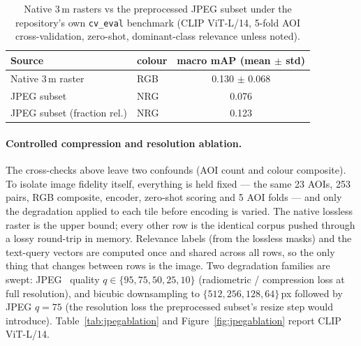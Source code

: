 \documentclass{article}
\begin{document}
\begin{appendices}
\begin{table}[H]
    \centering
    \caption{Native 3\,m rasters vs the preprocessed JPEG subset under the
    repository's own \texttt{cv\_eval} benchmark (CLIP ViT-L/14, 5-fold AOI
    cross-validation, zero-shot, dominant-class relevance unless noted).}
    \label{tab:native3mcv}
    \begin{tabular}{llc}
        \toprule
        \textbf{Source} & \textbf{colour} & \textbf{macro mAP (mean $\pm$ std)} \\
        \midrule
        Native 3\,m raster & RGB & 0.130 $\pm$ 0.068 \\
        JPEG subset                    & NRG & 0.076 \\
        JPEG subset (fraction rel.)    & NRG & 0.123 \\
        \bottomrule
    \end{tabular}
\end{table}

\paragraph{Controlled compression and resolution ablation.}
The cross-checks above leave two confounds (AOI count and colour composite). To
isolate image fidelity itself, everything is held fixed --- the same 23 AOIs, 253
pairs, RGB composite, encoder, zero-shot scoring and 5 AOI folds --- and only the
degradation applied to each tile before encoding is varied. The native lossless
raster is the upper bound; every other row is the identical corpus pushed through a
lossy round-trip in memory. Relevance labels (from the lossless masks) and the
text-query vectors are computed once and shared across all rows, so the only thing
that changes between rows is the image. Two degradation families are swept: JPEG~\cite{jpeg}
quality $q\in\{95,75,50,25,10\}$ (radiometric / compression loss at full
resolution), and bicubic downsampling to $\{512,256,128,64\}$\,px followed by JPEG
$q{=}75$ (the resolution loss the preprocessed subset's resize step would
introduce). Table~\ref{tab:jpegablation} and Figure~\ref{fig:jpegablation} report
CLIP ViT-L/14.


\end{appendices}
\end{document}
